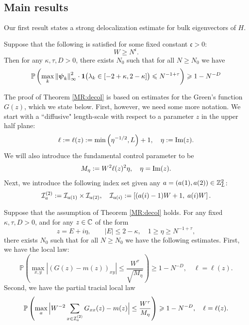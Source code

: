 \subsection{Main results}

Our first result states a strong delocalization estimate for bulk eigenvectors of $H$. 


\begin{theorem}[Delocalization]\label{MR:decol}
Suppose that the following is satisfied for some fixed constant $ \mathfrak c>0$: 
\begin{equation}\label{Main_DEL_COND}
    W \ge N^{\mathfrak c}. 
\end{equation}
Then for any $\kappa, \tau, D>0$, there exists $N_0$ such that for all $N \geqslant N_0$ we have
$$
\mathbb{P}\left( \max_k\left\|\boldsymbol{\psi}_k\right\|_{\infty}^2 \cdot {\bf1}\big(\lambda_k\in[-2+\kappa,2-\kappa]\big)\leqslant N^{-1+\tau}  \right) \geqslant 1-N^{-D}
$$
\end{theorem}

The proof of Theorem \ref{MR:decol} is based on estimates for the Green's function $G(z)$, which we state below. First, however, we need some more notation. We start with a ``diffusive" length-scale with respect to a parameter $z$ in the upper half plane:
%
\begin{align}
\ell:=\ell(z):=\min\left(\eta^{-1/2},L\right)+1, \quad\eta:=\mathrm{Im}(z).\label{def_ellz}
\end{align}
%
We will also introduce the fundamental control parameter to be
%
\begin{align}
M_{\eta}:=W^{2}\ell(z)^{2}\eta,\quad\eta=\mathrm{Im}(z).\label{def_meta}
\end{align}
%
Next, we introduce the following index set given any $a=(a(1),a(2))\in\mathbb{Z}_{L}^{2}$:
%
\begin{align*}
{\cal I}^{(2)}_{a}:={\cal I}_{a(1)}\times{\cal I}_{a(2)},\quad{\cal I}_{a(i)} := \left[ (a(i)-1)W + 1, \; a(i)W \right].
\end{align*}
%
\begin{theorem}\label{MR:locSC} Suppose that the assumption of Theorem \ref{MR:decol} holds. For any fixed $\kappa, \tau,D>0$, and for any $z\in\mathbb C$ of the form 
$$z=E+i\eta,\quad\quad |E|\le  2-\kappa, \quad 1\ge \eta\ge N^{-1+\tau},
$$
there exists $N_0$ such that for all $N \geqslant N_0$ we have the following estimates. First, we have the local law:
\begin{equation}\label{G_bound}
   \mathbb P\left( \max_{x,y}  \left|\left(G(z)-m(z)\right)_{xy}\right|\le  \frac{W^\tau}{\sqrt{M_{\eta}}}\right)\geqslant 1-N^{-D},\quad \ell=\ell(z).
\end{equation}
Second, we have the partial tracial local law
\begin{equation}\label{G_bound_ave}
\mathbb{P}\left(\max_a\Big| W^{-2}\sum_{x\in {\cal I}^{(2)}_a}G_{xx}(z)-m(z) \Big| \le \frac{W^\tau}{M_{\eta}} \right)\geqslant 1-N^{-D},\quad \ell=\ell(z). 
\end{equation}

\end{theorem}


